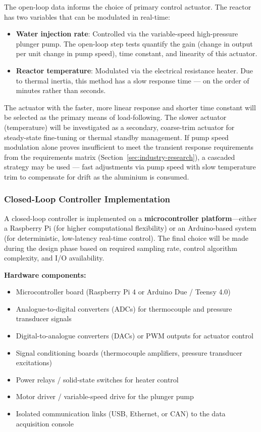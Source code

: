 \documentclass[12pt]{article}
\begin{document}
The open-loop data informs the choice of primary control actuator. The reactor has 
two variables that can be modulated in real-time:

\begin{itemize}
    \item \textbf{Water injection rate}: Controlled via the variable-speed 
    high-pressure plunger pump. The open-loop step tests quantify the gain (change 
    in output per unit change in pump speed), time constant, and linearity of this 
    actuator.
    
    \item \textbf{Reactor temperature}: Modulated via the electrical resistance 
    heater. Due to thermal inertia, this method has a slow response time --- on the 
    order of minutes rather than seconds.
\end{itemize}

The actuator with the faster, more linear response and shorter time constant will 
be selected as the primary means of load-following. The slower actuator 
(temperature) will be investigated as a secondary, coarse-trim actuator for 
steady-state fine-tuning or thermal standby management. If pump speed modulation 
alone proves insufficient to meet the transient response requirements from the 
requirements matrix (Section~\ref{sec:industry-research}), a cascaded strategy may 
be used --- fast adjustments via pump speed with slow temperature trim to 
compensate for drift as the aluminium is consumed.

\subsubsection*{Closed-Loop Controller Implementation}

A closed-loop controller is implemented on a \textbf{microcontroller platform}---either 
a Raspberry Pi (for higher computational flexibility) or an Arduino-based system 
(for deterministic, low-latency real-time control). The final choice will be made 
during the design phase based on required sampling rate, control algorithm 
complexity, and I/O availability.

\textbf{Hardware components:}
\begin{itemize}
    \item Microcontroller board (Raspberry Pi 4 or Arduino Due / Teensy 4.0)
    \item Analogue-to-digital converters (ADCs) for thermocouple and pressure 
    transducer signals
    \item Digital-to-analogue converters (DACs) or PWM outputs for actuator control
    \item Signal conditioning boards (thermocouple amplifiers, pressure transducer 
    excitations)
    \item Power relays / solid-state switches for heater control
    \item Motor driver / variable-speed drive for the plunger pump
    \item Isolated communication links (USB, Ethernet, or CAN) to the data 
    acquisition console
\end{itemize}
\end{document}
